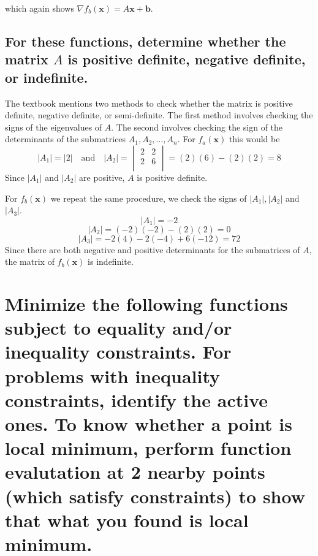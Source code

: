 \documentclass[11pt]{scrartcl}
\newcommand{\vect}{\boldsymbol}
\begin{document}
which again shows $\nabla f_b(\vect{x}) = A\vect{x} + \vect{b}$.

\subsection{For these functions, determine whether the matrix $A$ is positive definite,
negative definite, or indefinite.}
The textbook mentions two methods to check whether the matrix is positive definite, negative definite, or
semi-definite.
The first method involves checking the signs of the eigenvalues of $A$.
The second involves checking the sign of the determinants of the submatrices $A_1, A_2,\dots,A_n$.
For $f_a(\vect{x})$ this would be 
\begin{equation*}
|A_1| = |2|\quad\textrm{and}\quad |A_2| =
\begin{vmatrix}
2 & 2\\
2 & 6\\
\end{vmatrix}
= (2)(6) - (2)(2) = 8
\end{equation*}
Since $|A_1|$ and $|A_2|$ are positive, $A$ is positive definite.

For $f_b(\vect{x})$ we repeat the same procedure, we check the signs of $|A_1|,|A_2|$ and $|A_3|$.
\[|A_1| = -2\]
\[|A_2| = (-2)(-2) - (2)(2) = 0\]
\[|A_3| = -2(4) - 2(-4) + 6(-12) = 72\]
Since there are both negative and positive determinants for the submatrices of $A$,
the matrix of $f_b(\vect{x})$ is indefinite.

\section{Minimize the following functions subject to equality and/or inequality
constraints. For problems with inequality constraints, identify the active ones.
To know whether a point is local minimum, perform function evalutation at 2 
nearby points (which satisfy constraints) to show that what you found is local
minimum.}
\end{document}
